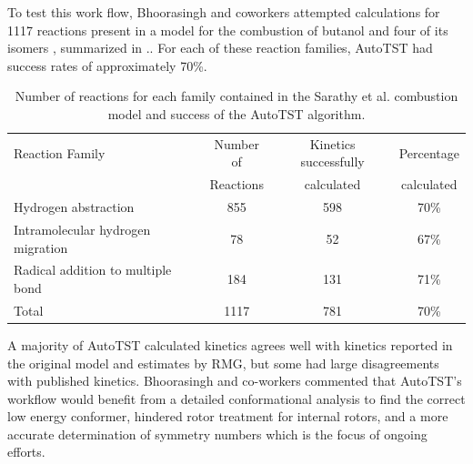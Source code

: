 \documentclass[preprint, 11pt]{elsarticle} %
\begin{document}

To test this work flow, Bhoorasingh and coworkers attempted calculations for 1117 reactions present in a model for the combustion of butanol and four of its isomers \cite{Sarathy:2012}, summarized in ..
For each of these reaction families, AutoTST had success rates of approximately 70\%.

\begin{table}[h!]
\label{t:atst_r}
\small
\caption{\label{table:ModelRxns} Number of reactions for each family contained in the Sarathy et al. \cite{Sarathy:2012} combustion model and success of the AutoTST algorithm.}
\centering
\begin{tabular*}{\linewidth}{@{\extracolsep{\fill}}lccc}
\hline\rule{0pt}{2.6ex}%
Reaction Family & Number of  & Kinetics successfully & Percentage \\
  & Reactions  & calculated & calculated\\
\hline\rule{0pt}{2.6ex}%
Hydrogen abstraction & 855 & 598 & 70\% \\
Intramolecular hydrogen migration & 78 & 52 & 67\% \\
Radical addition to multiple bond & 184 & 131 & 71\% \\
\hline\rule{0pt}{2.6ex}%
Total & 1117 & 781 & 70\%\\
\hline
\end{tabular*}
\end{table}

A majority of AutoTST calculated kinetics agrees well with kinetics reported in the original model and estimates by RMG, but some had large disagreements with published kinetics. 
Bhoorasingh and co-workers commented that AutoTST's workflow would benefit from a detailed conformational analysis to find the correct low energy conformer, hindered rotor treatment for internal rotors, and a more accurate determination of symmetry numbers which is the focus of ongoing efforts. 
\end{document}
